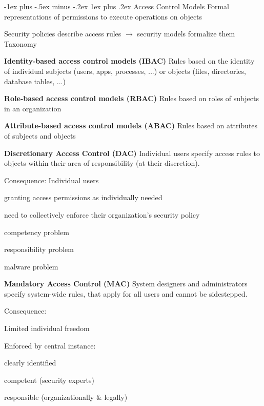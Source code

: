 \documentclass[a4paper]{article}
\makeatletter
\renewcommand{\note}[2]{\begin{noteBox} \textbf{#1} #2 \end{noteBox}}
\renewcommand{\subsubsection}{\@startsection{subsubsection}{3}{0mm}%
                {-1ex plus -.5ex minus -.2ex}%
                {1ex plus .2ex}%
                {\normalfont\small\bfseries}}
\makeatother
\begin{document}
\begin{multicols}{3}
    \subsubsection{Access Control Models}
    Formal representations of permissions to execute operations on objects

    Security policies describe access rules $\rightarrow$ security models formalize them Taxonomy
    \note{Identity-based access control models (IBAC)}{Rules based on the identity of individual subjects (users, apps, processes, ...) or objects (files, directories, database tables, ...)}

    \note{Role-based access control models (RBAC)}{Rules based on roles of subjects in an organization}

    \note{Attribute-based access control models (ABAC)}{Rules based on attributes of subjects and objects}

    \note{Discretionary Access Control (DAC)}{Individual users specify access rules to objects within their area of responsibility (at their discretion).}
    Consequence: Individual users
    \begin{itemize*}
        \item granting access permissions as individually needed
        \item need to collectively enforce their organization’s security policy
        \begin{itemize*}
            \item competency problem
            \item responsibility problem
            \item malware problem
        \end{itemize*}
    \end{itemize*}

    \note{Mandatory Access Control (MAC)}{System designers and administrators specify system-wide rules, that apply for all users and cannot be sidestepped.}
    Consequence:
    \begin{itemize*}
        \item Limited individual freedom
        \item Enforced by central instance:
        \begin{itemize*}
            \item clearly identified
            \item competent (security experts)
            \item responsible (organizationally \& legally)
        \end{itemize*}
    \end{itemize*}


\end{multicols}
\end{document}
